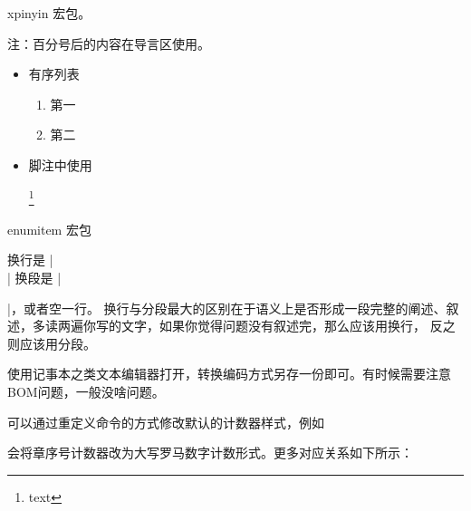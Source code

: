 
xpinyin 宏包。









注：百分号后的内容在导言区使用。
\begin{itemize}
\item 有序列表
  \begin{texlist}
    \begin{enumerate}[label={\ding{\value*}},start=172]
    \item 第一
    \item 第二
    \end{enumerate}
  \end{texlist}
\item 脚注中使用
  \begin{texlist}

    \footnote{text}
  \end{texlist}
\end{itemize}



enumitem 宏包



换行是 |\\| 换段是 |\par|，或者空一行。
换行与分段最大的区别在于语义上是否形成一段完整的阐述、叙述，多读两遍你写的文字，如果你觉得问题没有叙述完，那么应该用换行，
反之则应该用分段。



使用记事本之类文本编辑器打开，转换编码方式另存一份即可。有时候需要注意BOM问题，一般没啥问题。



可以通过重定义命令的方式修改默认的计数器样式，例如
\begin{texinlist}
  \renewcommand{\thechapter}{\Roman{chapter}}
\end{texinlist}
会将章序号计数器改为大写罗马数字计数形式。更多对应关系如下所示：

